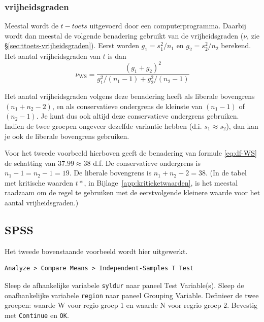 \documentclass[
]{book}
\begin{document}
\hypertarget{vrijheidsgraden}{%
\subsubsection{vrijheidsgraden}\label{vrijheidsgraden}}

Meestal wordt de \(t-toets\) uitgevoerd door een computerprogramma. Daarbij wordt
dan meestal de volgende benadering gebruikt van de vrijheidsgraden
(\(\nu\), zie §\ref{sec:ttoets-vrijheidsgraden}).
Eerst worden \(g_1=s^2_1/n_1\)
en \(g_2=s^2_2/n_2\) berekend. Het aantal vrijheidsgraden van \(t\) is dan
\begin{equation}
  \label{eq:df-WS}
  \nu_\textrm{WS} = 
        \frac {(g_1+g_2)^2} {g^2_1/(n_1-1) + g^2_2/(n_2-1)}
\end{equation}

Het aantal vrijheidsgraden volgens deze benadering heeft als liberale
bovengrens \((n_1+n_2-2)\), en als conservatieve ondergrens de kleinste
van \((n_1-1)\) of \((n_2-1)\). Je kunt dus ook altijd deze conservatieve
ondergrens gebruiken. Indien de twee groepen ongeveer dezelfde variantie
hebben (d.i. \(s_1 \approx s_2\)), dan kan je ook de liberale bovengrens
gebruiken.

Voor het tweede voorbeeld hierboven geeft de benadering van formule
\eqref{eq:df-WS} de
schatting van \(37.99 \approx 38\) d.f. De conservatieve ondergrens is
\(n_1-1 = n_2-1 = 19\). De liberale bovengrens is \(n_1+n_2 -2 = 38\). (In
de tabel met kritische waarden \(t*\), in
Bijlage~\ref{app:kritieketwaarden}, is het meestal raadzaam om de regel
te gebruiken met de eerstvolgende kleinere waarde voor het aantal
vrijheidsgraden.)

\hypertarget{sec:SPSS-ttoets-ongepaard}{%
\subsection{SPSS}\label{sec:SPSS-ttoets-ongepaard}}

Het tweede bovenstaande voorbeeld wordt hier uitgewerkt.

\begin{verbatim}
Analyze > Compare Means > Independent-Samples T Test
\end{verbatim}

Sleep de afhankelijke variabele \texttt{syldur} naar paneel Test Variable(s).
Sleep de onafhankelijke variabele \texttt{region} naar paneel Grouping
Variable. Definieer de twee groepen: waarde W voor regio groep 1 en
waarde N voor regrio groep 2. Bevestig met \texttt{Continue} en \texttt{OK}.
\end{document}
